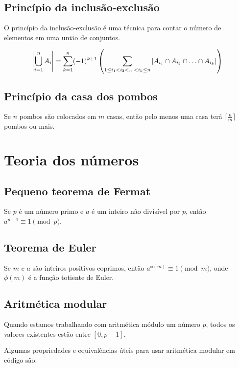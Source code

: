 \subsection{Princípio da inclusão-exclusão}

O princípio da inclusão-exclusão é uma técnica para contar o número de elementos em uma união de conjuntos.

\begin{equation*}
\large
\left| \bigcup_{i=1}^{n} A_i \right| = \sum_{k=1}^{n} (-1)^{k+1} \left( \sum_{1 \leq i_1 < i_2 < \ldots < i_k \leq n} \left| A_{i_1} \cap A_{i_2} \cap \ldots \cap A_{i_k} \right| \right)
\end{equation*}

\subsection{Princípio da casa dos pombos}

Se $n$ pombos são colocados em $m$ casas, então pelo menos uma casa terá $\lceil \frac{n}{m} \rceil$ pombos ou mais.

\section{Teoria dos números}

\subsection{Pequeno teorema de Fermat}

Se $p$ é um número primo e $a$ é um inteiro não divisível por $p$, então $a^{p-1} \equiv 1 \pmod{p}$.

\subsection{Teorema de Euler}

Se $m$ e $a$ são inteiros positivos coprimos, então $a^{\phi(m)} \equiv 1 \pmod{m}$, onde $\phi(m)$ é a função totiente de Euler.

\subsection{Aritmética modular}

Quando estamos trabalhando com aritmética módulo um número $p$, todos os valores existentes estão entre $[0, p-1]$. 

Algumas propriedades e equivalências úteis para usar aritmética modular em código são:

